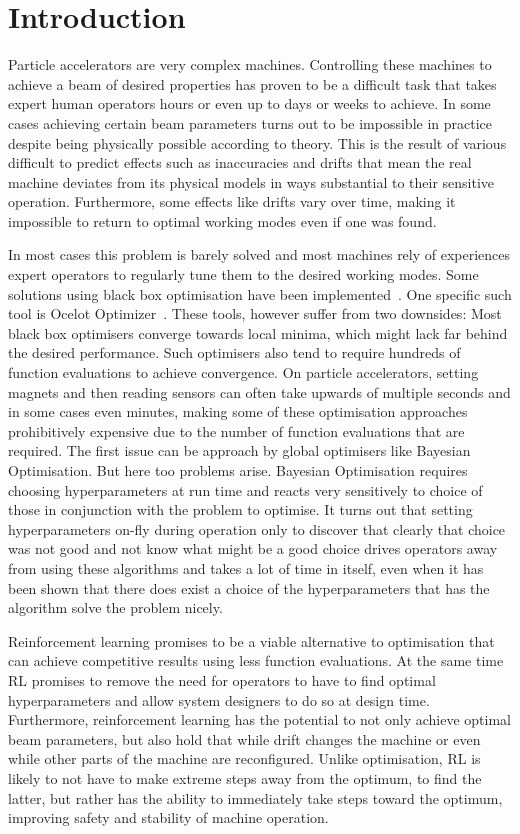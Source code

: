 \section{Introduction}

Particle accelerators are very complex machines. Controlling these machines to achieve a beam of desired properties has proven to be a difficult task that takes expert human operators hours or even up to days or weeks to achieve. In some cases achieving certain beam parameters turns out to be impossible in practice despite being physically possible according to theory. This is the result of various difficult to predict effects such as inaccuracies and drifts that mean the real machine deviates from its physical models in ways substantial to their sensitive operation. Furthermore, some effects like drifts vary over time, making it impossible to return to optimal working modes even if one was found.

In most cases this problem is barely solved and most machines rely of experiences expert operators to regularly tune them to the desired working modes. Some solutions using black box optimisation have been implemented~\cite{TODO}. One specific such tool is Ocelot Optimizer~\cite{TODO}. These tools, however suffer from two downsides: Most black box optimisers converge towards local minima, which might lack far behind the desired performance. Such optimisers also tend to require hundreds of function evaluations to achieve convergence. On particle accelerators, setting magnets and then reading sensors can often take upwards of multiple seconds and in some cases even minutes, making some of these optimisation approaches prohibitively expensive due to the number of function evaluations that are required. The first issue can be approach by global optimisers like Bayesian Optimisation. But here too problems arise. Bayesian Optimisation requires choosing hyperparameters at run time and reacts very sensitively to choice of those in conjunction with the problem to optimise. It turns out that setting hyperparameters on-fly during operation only to discover that clearly that choice was not good and not know what might be a good choice drives operators away from using these algorithms and takes a lot of time in itself, even when it has been shown that there does exist a choice of the hyperparameters that has the algorithm solve the problem nicely.

Reinforcement learning promises to be a viable alternative to optimisation that can achieve competitive results using less function evaluations. At the same time \ac{RL} promises to remove the need for operators to have to find optimal hyperparameters and allow system designers to do so at design time. Furthermore, reinforcement learning has the potential to not only achieve optimal beam parameters, but also hold that while drift changes the machine or even while other parts of the machine are reconfigured. Unlike optimisation, \ac{RL} is likely to not have to make extreme steps away from the optimum, to find the latter, but rather has the ability to immediately take steps toward the optimum, improving safety and stability of machine operation.

